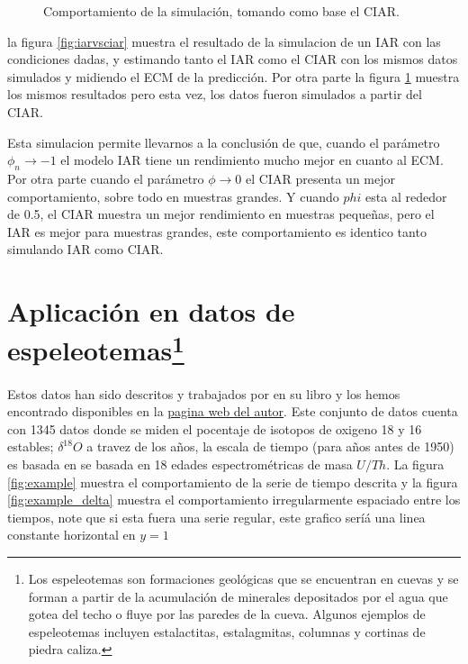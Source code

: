 \begin{figure}[h]
\begin{minipage}{0.45\textwidth}
    \caption{Comportamiento de la simulación, tomando como base el CIAR.}
    \label{fig:ciarvsiar}
    \end{minipage}
\end{figure}

la figura \ref{fig:iarvsciar} muestra el resultado de la simulacion de un IAR con las condiciones dadas, y estimando tanto  el IAR como el CIAR
con los mismos datos simulados y midiendo el ECM de la predicción. Por otra parte la figura \ref{fig:ciarvsiar} muestra los mismos resultados pero esta vez,
los datos fueron simulados a partir del CIAR.

Esta simulacion permite llevarnos a la conclusión de que, cuando el parámetro $\phi_n \to -1$ el modelo IAR tiene un rendimiento mucho mejor en cuanto al ECM. 
Por otra parte cuando el parámetro $\phi \to 0$ el CIAR presenta un mejor comportamiento, sobre todo en muestras grandes. Y cuando $phi$ esta al rededor de 0.5, el CIAR muestra
un mejor rendimiento en muestras pequeñas, pero el IAR es mejor para muestras grandes, este comportamiento es identico tanto simulando IAR como CIAR.


\section{Aplicación en datos de espeleotemas\protect\footnote{Los espeleotemas son formaciones geológicas que se encuentran en cuevas y se forman a partir de la acumulación de minerales depositados por el agua que gotea del techo o fluye por las paredes de la cueva. Algunos ejemplos de espeleotemas incluyen estalactitas, estalagmitas, columnas y cortinas de piedra caliza.}}

Estos datos han sido descritos y trabajados por \cite{mudelse2014climate} en su libro y los hemos encontrado disponibles en la \href{https://www.manfredmudelsee.com/}{pagina web del autor}. Este conjunto de datos cuenta con 1345 datos donde se miden el pocentaje de 
isotopos de oxigeno 18 y 16 estables; $\delta^{18}O$ a travez de los años, la escala de tiempo (para años antes de 1950) es basada en
se basada en 18 edades espectrométricas de masa $U/Th$. La figura \ref{fig:example} muestra el comportamiento de la serie de tiempo descrita y la figura 
\ref{fig:example_delta} muestra el comportamiento irregularmente espaciado entre los tiempos, note que si esta fuera una serie regular, este grafico seríá una
linea constante horizontal en $y=1$




